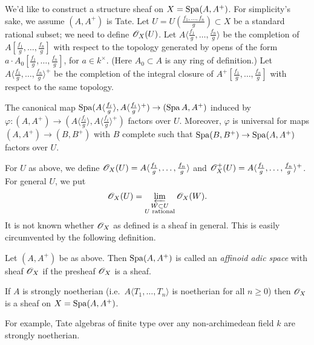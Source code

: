 \documentclass{article}
\begin{document}
We'd like to construct a structure sheaf on $X=\operatorname{Spa}(A,A^+)$. For simplicity's 
sake, we assume $(A,A^+)$ is Tate. Let 
$U=U\left(\frac{f_1,\dots,f_n}{g}\right)\subset X$ be a standard rational 
subset; we need to define $\mathscr{O}_X(U)$. Let 
$A\langle \frac{f_1}{g},\dots,\frac{f_n}{g}\rangle$ be the completion of 
$A[\frac{f_1}{g},\dots,\frac{f_n}{g}]$ with respect to the topology generated 
by opens of the form $a\cdot A_0[\frac{f_1}{g},\dots,\frac{f_n}{g}]$, for 
$a\in k^\times$. (Here $A_0\subset A$ is any ring of definition.) 
Let $A\langle \frac{f_1}{g},\dots,\frac{f_n}{g}\rangle^+$ be the completion of 
the integral closure of $A^+[\frac{f_1}{g},\dots,\frac{f_n}{g}]$ with respect 
to the same topology. 

\begin{proposition}
The canonical map $\operatorname{Spa}(A\langle\frac{f_i}{g}\rangle,A\langle \frac{f_i}{g}\rangle^+) \to (\operatorname{Spa} A,A^+)$ induced by $\varphi:(A,A^+) \to (A\langle \frac{f_i}{g}\rangle, A\langle \frac{f_i}{g}\rangle^+)$ factors over $U$. Moreover, $\varphi$ is universal for maps 
$(A,A^+) \to (B,B^+)$ with $B$ complete such that $\operatorname{Spa}(B,B^+) \to \operatorname{Spa}(A,A^+)$ factors over $U$. 
\end{proposition}

For $U$ as above, we define 
$\mathscr{O}_X(U)=A\langle \frac{f_1}{g},\dots,\frac{f_n}{g}\rangle$ and 
$\mathscr{O}_X^+(U) = A\langle \frac{f_1}{g},\dots,\frac{f_n}{g}\rangle^+$. For general 
$U$, we put 
\[
  \mathscr{O}_X(U) = \varprojlim_{\substack{W\subset U \\ U\text{ rational}}} \mathscr{O}_X(W) .
\]
It is not known whether $\mathscr{O}_X$ as defined is a sheaf in general. This is 
easily circumvented by the following definition. 

\begin{definition}
Let $(A,A^+)$ be as above. Then $\operatorname{Spa}(A,A^+)$ is called an \emph{affinoid adic 
space} with sheaf $\mathscr{O}_X$ if the presheaf $\mathscr{O}_X$ is a sheaf. 
\end{definition}

\begin{theorem}
If $A$ is strongly noetherian (i.e.\ $A\langle T_1,\dots,T_n\rangle$ is 
noetherian for all $n\geqslant 0$) then $\mathscr{O}_X$ is a sheaf on $X=\operatorname{Spa}(A,A^+)$. 
\end{theorem}

For example, Tate algebras of finite type over any non-archimedean field $k$ 
are strongly noetherian. 
\end{document}
